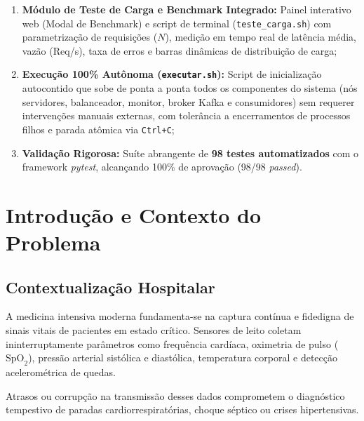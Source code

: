 \documentclass[12pt,a4paper]{article}
\begin{document}
\begin{enumerate}
	\item \textbf{Módulo de Teste de Carga e Benchmark Integrado:} Painel interativo web (Modal de Benchmark) e script de terminal (\texttt{teste\_carga.sh}) com parametrização de requisições ($N$), medição em tempo real de latência média, vazão (Req/s), taxa de erros e barras dinâmicas de distribuição de carga;
	\item \textbf{Execução 100\% Autônoma (\texttt{executar.sh}):} Script de inicialização autocontido que sobe de ponta a ponta todos os componentes do sistema (nós servidores, balanceador, monitor, broker Kafka e consumidores) sem requerer intervenções manuais externas, com tolerância a encerramentos de processos filhos e parada atômica via \texttt{Ctrl+C};
	\item \textbf{Validação Rigorosa:} Suíte abrangente de \textbf{98 testes automatizados} com o framework \textit{pytest}, alcançando 100\% de aprovação (98/98 \textit{passed}).
\end{enumerate}

\newpage

\section{Introdução e Contexto do Problema}

\subsection{Contextualização Hospitalar}
A medicina intensiva moderna fundamenta-se na captura contínua e fidedigna de sinais vitais de pacientes em estado crítico. Sensores de leito coletam ininterruptamente parâmetros como frequência cardíaca, oximetria de pulso ($\text{SpO}_2$), pressão arterial sistólica e diastólica, temperatura corporal e detecção acelerométrica de quedas.

Atrasos ou corrupção na transmissão desses dados comprometem o diagnóstico tempestivo de paradas cardiorrespiratórias, choque séptico ou crises hipertensivas.
\end{document}
